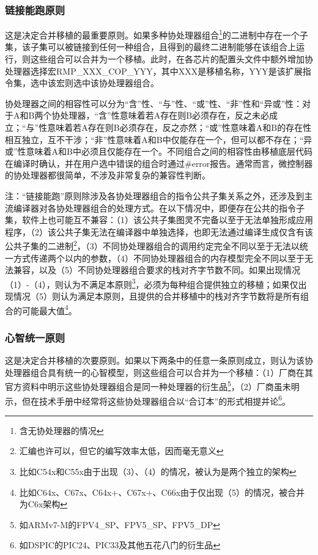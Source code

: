 \subsubsection{链接能跑原则}\label{subsubsec:the-link-and-run-rule}

这是决定合并移植的最重要原则。如果多种协处理器组合\footnote{含无协处理器的情况}的二进制中存在一个子集，该子集可以被链接到任何一种组合，且得到的最终二进制能够在该组合上运行，则这些组合可以合并为一个移植。此时，在各芯片的配置头文件中额外增加协处理器选择宏RMP\_XXX\_COP\_YYY，其中XXX是移植名称，YYY是该扩展指令集，选中该宏则选中该协处理器组合。

协处理器之间的相容性可以分为``含''性、``与''性、``或''性、``非''性和``异或''性：对于A和B两个协处理器，``含''性意味着若A存在则B必须存在，反之未必成立；``与''性意味着若A存在则B必须存在，反之亦然；``或''性意味着A和B的存在性相互独立，互不干涉；``非''性意味着A和B中仅能存在一个，但可以都不存在；``异或''性意味着A和B中必须且仅能存在一个。不同组合之间的相容性由移植底层代码在编译时确认，并在用户选中错误的组合时通过\#error报告。通常而言，微控制器的协处理器都很简单，不涉及非常复杂的兼容性判断。

注：``链接能跑''原则除涉及各协处理器组合的指令公共子集关系之外，还涉及到主流编译器对各协处理器组合的处理方式。在以下情况中，即便存在公共的指令子集，软件上也可能互不兼容：（1）该公共子集图灵不完备以至于无法单独形成应用程序，（2）该公共子集无法在编译器中单独选择，也即无法通过编译生成仅含有该公共子集的二进制\footnote{汇编也许可以，但它的编写效率太低，因而毫无意义}，（3）不同协处理器组合的调用约定完全不同以至于无法以统一方式传递两个以内的参数，（4）不同协处理器组合的内存模型完全不同以至于无法兼容，以及（5）不同协处理器组合要求的栈对齐字节数不同。如果出现情况（1）-（4），则认为不满足本原则\footnote{比如C54x和C55x由于出现（3）、（4）的情况，被认为是两个独立的架构}，必须为每种组合提供独立的移植；如果仅出现情况（5）则认为满足本原则，且提供的合并移植中的栈对齐字节数将是所有组合的可能最大值\footnote{比如C64x、C67x、C64x+、C67x+、C66x由于仅出现（5）的情况，被合并为C6x架构}。

\subsubsection{心智统一原则}\label{subsubsec:the-mental-model-rule}

这是决定合并移植的次要原则。如果以下两条中的任意一条原则成立，则认为该协处理器组合具有统一的心智模型，则这些组合可以合并为一个移植：（1）厂商在其官方资料中明示这些协处理器组合是同一种处理器的衍生品\footnote{如ARMv7-M的FPV4\_SP、FPV5\_SP、FPV5\_DP}，（2）厂商虽未明示，但在技术手册中经常将这些协处理器组合以``合订本''的形式相提并论\footnote{如DSPIC的PIC24、PIC33及其他五花八门的衍生品}。

